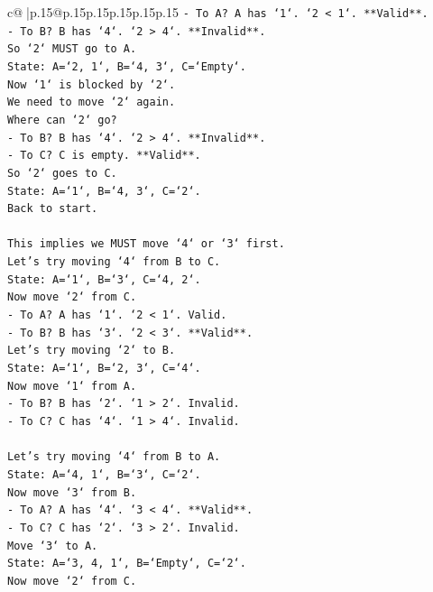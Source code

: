 \documentclass{article}
\begin{document}
{\begin{supertabular}{c@{$\;$}|p{.15\linewidth}@{}p{.15\linewidth}p{.15\linewidth}p{.15\linewidth}p{.15\linewidth}p{.15\linewidth}}
{{{\texttt{{-} To A? A has `1`. `2 < 1`. **Valid**.} \\
\texttt{{-} To B? B has `4`. `2 > 4`. **Invalid**.} \\
\texttt{So `2` MUST go to A.} \\
\texttt{State: A=`2, 1`, B=`4, 3`, C=`Empty`.} \\
\texttt{Now `1` is blocked by `2`.} \\
\texttt{We need to move `2` again.} \\
\texttt{Where can `2` go?} \\
\texttt{{-} To B? B has `4`. `2 > 4`. **Invalid**.} \\
\texttt{{-} To C? C is empty. **Valid**.} \\
\texttt{So `2` goes to C.} \\
\texttt{State: A=`1`, B=`4, 3`, C=`2`.} \\
\texttt{Back to start.} \\
\\ 
\texttt{This implies we MUST move `4` or `3` first.} \\
\texttt{Let's try moving `4` from B to C.} \\
\texttt{State: A=`1`, B=`3`, C=`4, 2`.} \\
\texttt{Now move `2` from C.} \\
\texttt{{-} To A? A has `1`. `2 < 1`. Valid.} \\
\texttt{{-} To B? B has `3`. `2 < 3`. **Valid**.} \\
\texttt{Let's try moving `2` to B.} \\
\texttt{State: A=`1`, B=`2, 3`, C=`4`.} \\
\texttt{Now move `1` from A.} \\
\texttt{{-} To B? B has `2`. `1 > 2`. Invalid.} \\
\texttt{{-} To C? C has `4`. `1 > 4`. Invalid.} \\
\\ 
\texttt{Let's try moving `4` from B to A.} \\
\texttt{State: A=`4, 1`, B=`3`, C=`2`.} \\
\texttt{Now move `3` from B.} \\
\texttt{{-} To A? A has `4`. `3 < 4`. **Valid**.} \\
\texttt{{-} To C? C has `2`. `3 > 2`. Invalid.} \\
\texttt{Move `3` to A.} \\
\texttt{State: A=`3, 4, 1`, B=`Empty`, C=`2`.} \\
\texttt{Now move `2` from C.} \\
}}}
\end{supertabular}}
\end{document}
